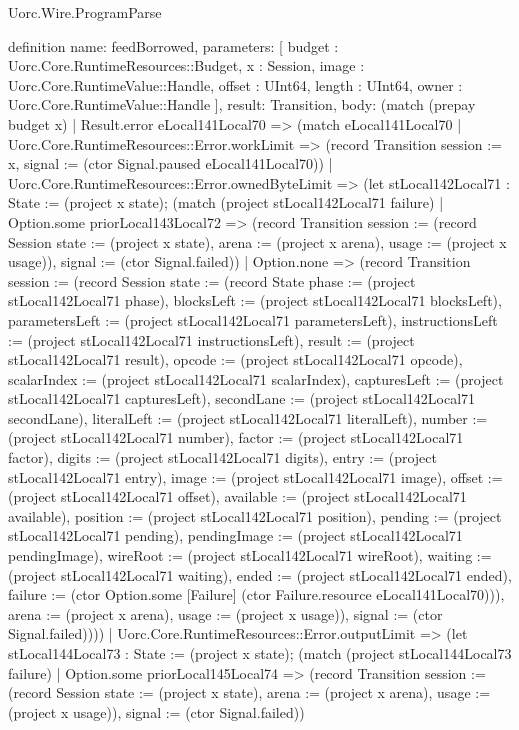 \begin{lexlean}{Uorc.Wire.ProgramParse}
\begin{semanticmodule}
definition{
  name: feedBorrowed,
  parameters: [
    budget : Uorc.Core.RuntimeResources::Budget,
    x : Session,
    image : Uorc.Core.RuntimeValue::Handle,
    offset : UInt64,
    length : UInt64,
    owner : Uorc.Core.RuntimeValue::Handle
  ],
  result: Transition,
  body: (match (prepay budget x)
    | Result.error eLocal141Local70 => (match eLocal141Local70
      | Uorc.Core.RuntimeResources::Error.workLimit => (record Transition {session := x, signal := (ctor Signal.paused eLocal141Local70)})
      | Uorc.Core.RuntimeResources::Error.ownedByteLimit => (let stLocal142Local71 : State := (project x state); (match (project stLocal142Local71 failure)
        | Option.some priorLocal143Local72 => (record Transition {session := (record Session {state := (project x state), arena := (project x arena), usage := (project x usage)}), signal := (ctor Signal.failed)})
        | Option.none => (record Transition {session := (record Session {state := (record State {phase := (project stLocal142Local71 phase), blocksLeft := (project stLocal142Local71 blocksLeft), parametersLeft := (project stLocal142Local71 parametersLeft), instructionsLeft := (project stLocal142Local71 instructionsLeft), result := (project stLocal142Local71 result), opcode := (project stLocal142Local71 opcode), scalarIndex := (project stLocal142Local71 scalarIndex), capturesLeft := (project stLocal142Local71 capturesLeft), secondLane := (project stLocal142Local71 secondLane), literalLeft := (project stLocal142Local71 literalLeft), number := (project stLocal142Local71 number), factor := (project stLocal142Local71 factor), digits := (project stLocal142Local71 digits), entry := (project stLocal142Local71 entry), image := (project stLocal142Local71 image), offset := (project stLocal142Local71 offset), available := (project stLocal142Local71 available), position := (project stLocal142Local71 position), pending := (project stLocal142Local71 pending), pendingImage := (project stLocal142Local71 pendingImage), wireRoot := (project stLocal142Local71 wireRoot), waiting := (project stLocal142Local71 waiting), ended := (project stLocal142Local71 ended), failure := (ctor Option.some [Failure] (ctor Failure.resource eLocal141Local70))}), arena := (project x arena), usage := (project x usage)}), signal := (ctor Signal.failed)})))
      | Uorc.Core.RuntimeResources::Error.outputLimit => (let stLocal144Local73 : State := (project x state); (match (project stLocal144Local73 failure)
        | Option.some priorLocal145Local74 => (record Transition {session := (record Session {state := (project x state), arena := (project x arena), usage := (project x usage)}), signal := (ctor Signal.failed)})
}
\end{semanticmodule}
\end{lexlean}
